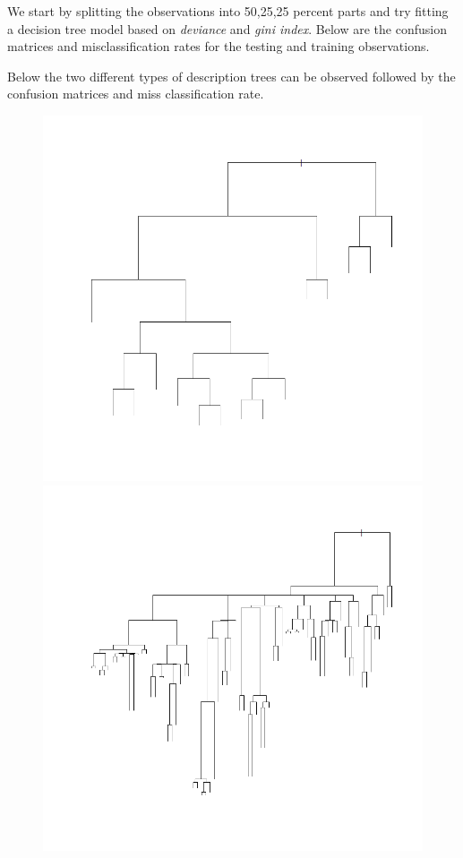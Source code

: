 \documentclass[a4paper,12pt]{article}
\begin{document}
We start by splitting the observations into 50,25,25 percent parts and try fitting a decision tree model based on \textit{deviance} and \textit{gini index}. Below are the confusion matrices and misclassification rates for the testing and training observations.

Below the two different types of description trees can be observed followed by the confusion matrices and miss classification rate.
\begin{figure}[H]
\centering
\begin{minipage}[]{0.49\textwidth}
  \includegraphics[width=\textwidth]{figures/deviance_table.png}  
 \end{minipage}
 \begin{minipage}[]{0.49\textwidth}
  \includegraphics[width=\textwidth]{figures/gini_table.png}  
 \end{minipage}
\end{figure}
\end{document}
